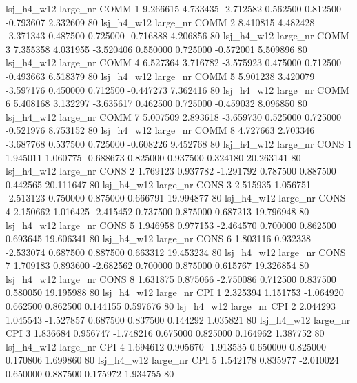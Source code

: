   lsj_h4_w12   large_nr     COMM                 1  9.266615  4.733435  -2.712582 0.562500 0.812500 -0.793607    2.332609 80
  lsj_h4_w12   large_nr     COMM                 2  8.410815  4.482428  -3.371343 0.487500 0.725000 -0.716888    4.206856 80
  lsj_h4_w12   large_nr     COMM                 3  7.355358  4.031955  -3.520406 0.550000 0.725000 -0.572001    5.509896 80
  lsj_h4_w12   large_nr     COMM                 4  6.527364  3.716782  -3.575923 0.475000 0.712500 -0.493663    6.518379 80
  lsj_h4_w12   large_nr     COMM                 5  5.901238  3.420079  -3.597176 0.450000 0.712500 -0.447273    7.362416 80
  lsj_h4_w12   large_nr     COMM                 6  5.408168  3.132297  -3.635617 0.462500 0.725000 -0.459032    8.096850 80
  lsj_h4_w12   large_nr     COMM                 7  5.007509  2.893618  -3.659730 0.525000 0.725000 -0.521976    8.753152 80
  lsj_h4_w12   large_nr     COMM                 8  4.727663  2.703346  -3.687768 0.537500 0.725000 -0.608226    9.452768 80
  lsj_h4_w12   large_nr     CONS                 1  1.945011  1.060775  -0.688673 0.825000 0.937500  0.324180   20.263141 80
  lsj_h4_w12   large_nr     CONS                 2  1.769123  0.937782  -1.291792 0.787500 0.887500  0.442565   20.111647 80
  lsj_h4_w12   large_nr     CONS                 3  2.515935  1.056751  -2.513123 0.750000 0.875000  0.666791   19.994877 80
  lsj_h4_w12   large_nr     CONS                 4  2.150662  1.016425  -2.415452 0.737500 0.875000  0.687213   19.796948 80
  lsj_h4_w12   large_nr     CONS                 5  1.946958  0.977153  -2.464570 0.700000 0.862500  0.693645   19.606341 80
  lsj_h4_w12   large_nr     CONS                 6  1.803116  0.932338  -2.533074 0.687500 0.887500  0.663312   19.453234 80
  lsj_h4_w12   large_nr     CONS                 7  1.709183  0.893600  -2.682562 0.700000 0.875000  0.615767   19.326854 80
  lsj_h4_w12   large_nr     CONS                 8  1.631875  0.875066  -2.750086 0.712500 0.837500  0.580050   19.195988 80
  lsj_h4_w12   large_nr      CPI                 1  2.325394  1.151753  -1.064920 0.662500 0.862500  0.144155    0.597676 80
  lsj_h4_w12   large_nr      CPI                 2  2.044293  1.045543  -1.527857 0.687500 0.837500  0.144292    1.035821 80
  lsj_h4_w12   large_nr      CPI                 3  1.836684  0.956747  -1.748216 0.675000 0.825000  0.164962    1.387752 80
  lsj_h4_w12   large_nr      CPI                 4  1.694612  0.905670  -1.913535 0.650000 0.825000  0.170806    1.699860 80
  lsj_h4_w12   large_nr      CPI                 5  1.542178  0.835977  -2.010024 0.650000 0.887500  0.175972    1.934755 80
